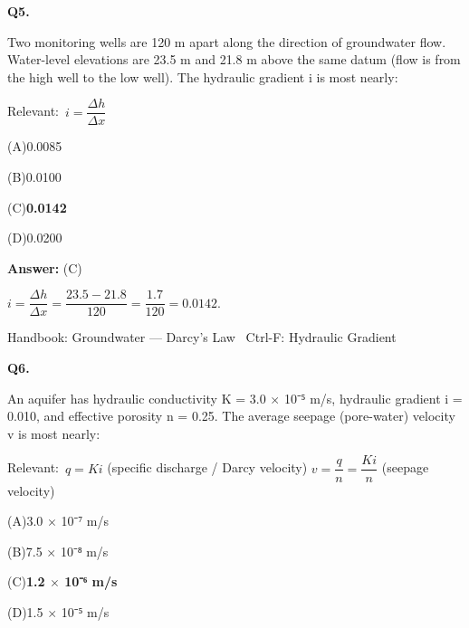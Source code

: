 \documentclass[11pt]{article}
\newcommand{\correct}[1]{\textbf{#1}\;{\color{accent}$\checkmark$}}
\newcommand{\optline}[2]{\par\noindent\hspace{1.2em}(#1)\hspace{0.6em}#2}
\begin{document}
\vspace{9pt}
\filbreak
\textbf{\color{accent}Q5.}\par\vspace{2pt}
Two monitoring wells are 120 m apart along the direction of groundwater flow. Water-level elevations are 23.5 m and 21.8 m above the same datum (flow is from the high well to the low well). The hydraulic gradient i is most nearly:\par\vspace{3pt}
{\small\color{soft}Relevant:}\ $i = \dfrac{\Delta h}{\Delta x}$\par\vspace{3pt}
\optline{A}{0.0085}
\optline{B}{0.0100}
\optline{C}{\correct{0.0142}}
\optline{D}{0.0200}
\par\vspace{3pt}
\vspace{2pt}\par\noindent\colorbox{boxbg}{\parbox{\dimexpr\linewidth-2\fboxsep\relax}{%
\vspace{2pt}\textbf{Answer:} (C)\par\vspace{2pt}
{\small $i = \dfrac{\Delta h}{\Delta x} = \dfrac{23.5 - 21.8}{120} = \dfrac{1.7}{120} = 0.0142$.}\par\vspace{2pt}
{\footnotesize\color{soft}Handbook: Groundwater --- Darcy's Law \textbullet\ Ctrl-F: Hydraulic Gradient}\vspace{2pt}
}}
\vspace{9pt}
\filbreak
\textbf{\color{accent}Q6.}\par\vspace{2pt}
An aquifer has hydraulic conductivity K = 3.0 $\times$ 10⁻⁵ m/s, hydraulic gradient i = 0.010, and effective porosity n = 0.25. The average seepage (pore-water) velocity v is most nearly:\par\vspace{3pt}
{\small\color{soft}Relevant:}\ $q = Ki$ (specific discharge / Darcy velocity) \quad $v = \dfrac{q}{n} = \dfrac{Ki}{n}$ (seepage velocity)\par\vspace{3pt}
\optline{A}{3.0 $\times$ 10⁻⁷ m/s}
\optline{B}{7.5 $\times$ 10⁻⁸ m/s}
\optline{C}{\correct{1.2 $\times$ 10⁻⁶ m/s}}
\optline{D}{1.5 $\times$ 10⁻⁵ m/s}
\par\vspace{3pt}
\end{document}
